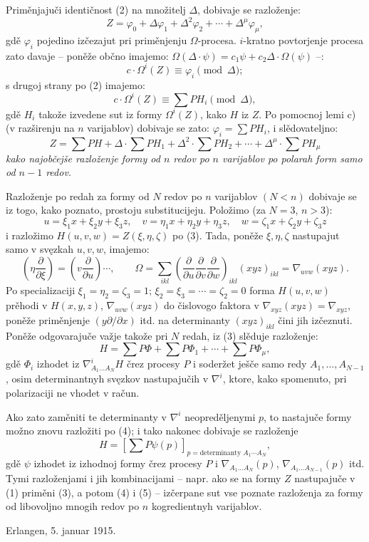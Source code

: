 \documentclass[11pt]{article}
\begin{document}
Priměnjajuči identičnost (2) na množitelj $\Delta$, dobivaje se razloženje:
\[
  Z=\varphi_0+\Delta\varphi_1+\Delta^2\varphi_2+\cdots+\Delta^\mu\varphi_\mu,
\]
gdě $\varphi_i$ pojedino izčezajut pri priměnjenju $\Omega$-procesa. $i$-kratno povtorjenje procesa zato davaje -- poněže občno imajemo: $\Omega(\Delta\cdot\psi)=c_1\psi+c_2\Delta\cdot\Omega(\psi)$ --:
\[
  c\cdot \Omega^i(Z)\equiv\varphi_i\pmod{\Delta};
\]
s drugoj strany po (2) imajemo:
\[
  c\cdot\Omega^i(Z)\equiv\sum PH_i\pmod{\Delta},
\]
gdě $H_i$ takože izvedene sut iz formy $\Omega^i(Z)$, kako $H$ iz $Z$. Po pomocnoj lemi c) (v razširenju na $n$ varijablov) dobivaje se zato: $\varphi_i=\sum PH_i$, i slědovateljno:
\begin{equation}
  Z=\sum PH+\Delta\cdot\sum PH_1+\Delta^2\cdot\sum PH_2+
  \cdots+\Delta^\mu\cdot\sum PH_\mu
\tag{3}
\end{equation}
{\itshape kako najobčejše razloženje formy od $n$ redov po $n$ varijablov po polarah form samo od $n-1$ redov.}

Razloženje po redah za formy od $N$ redov po $n$ varijablov $(N<n)$ dobivaje se iz togo, kako poznato, prostoju substitucijeju. Položimo (za $N=3$, $n>3$):
\[
  u=\xi_1x+\xi_2y+\xi_3z,
  \quad v=\eta_1x+\eta_2y+\eta_3z,
  \quad w=\zeta_1x+\zeta_2y+\zeta_3z
\]
i razložimo $H(u,v,w)=Z(\xi,\eta,\zeta)$ po (3). Tada, poněže $\xi,\eta,\zeta$ nastupajut samo v svęzkah $u,v,w$, imajemo:
\[
  \left(\eta\frac{\partial}{\partial \xi}\right)=
  \left(v\frac{\partial}{\partial u}\right)\cdots,
  \qquad
  \Omega=\sum_{ikl}\left(\frac{\partial}{\partial u}
  \frac{\partial}{\partial v}
  \frac{\partial}{\partial w}\right)_{ikl}(xyz)_{ikl}
  =\nabla_{uvw}(xyz).
\]
Po specializaciji $\xi_1=\eta_2=\zeta_3=1$; $\xi_2=\xi_3=\cdots=\zeta_2=0$ forma $H(u,v,w)$ prěhodi v $H(x,y,z)$, $\nabla_{uvw}(xyz)$ do čislovogo faktora v $\nabla_{xyz}(xyz)=\nabla_{xyz}$, poněže priměnjenje $(y\partial/\partial x)$ itd. na determinanty $(xyz)_{ikl}$ čini jih izčeznuti. Poněže odgovarajuče važje takože pri $N$ redah, iz (3) slěduje razloženje:
\begin{equation}
  H=\sum P\Phi+\sum P\Phi_1+\cdots+\sum P\Phi_\mu,
\tag{4}
\end{equation}
gdě $\Phi_i$ izhodet iz $\nabla^i_{A_1\ldots A_N}H$ črez procesy $P$ i soderžet ješče samo redy $A_1,\ldots,A_{N-1}$, osim determinantnyh svęzkov nastupajučih v $\nabla^i$, ktore, kako spomenuto, pri polarizaciji ne vhodet v račun.

Ako zato zaměniti te determinanty v $\nabla^i$ neopreděljenymi $p$, to nastajuče formy možno znovu razložiti po (4); i tako nakonec dobivaje se razloženje
\begin{equation}
  H=\left[\sum P\psi(p)\right]_{p=\text{determinanty }A_1\cdots A_N},
\tag{5}
\end{equation}
gdě $\psi$ izhodet iz izhodnoj formy črez procesy $P$ i $\nabla_{A_1\ldots A_N}(p)$, $\nabla_{A_1\ldots A_{N-1}}(p)$ itd. Tymi razloženjami i jih kombinacijami -- napr. ako se na formy $Z$ nastupajuče v (1) priměni (3), a potom (4) i (5) -- izčerpane sut vse poznate razloženja za formy od libovoljno mnogih redov po $n$ kogredientnyh varijablov.

Erlangen, 5. januar 1915.
\end{document}
